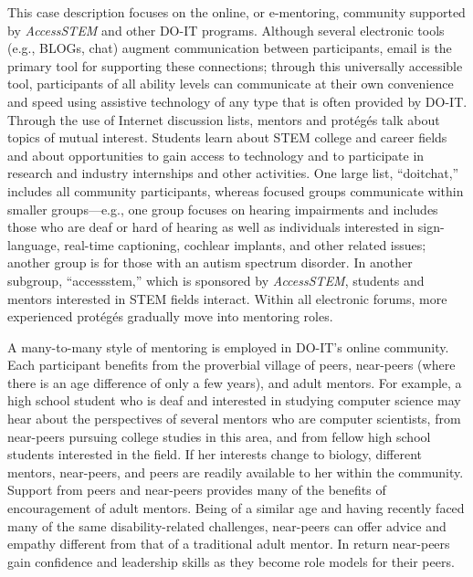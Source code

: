 \documentclass[11.5pt]{sig-alternate} %
\begin{document}
\begin{large}
This case description focuses on the online, or e-mentoring, community supported by\textit{ AccessSTEM} and other DO-IT programs. Although several electronic tools (e.g., BLOGs, chat) augment communication between participants, email is the primary tool for supporting these connections; through this universally accessible tool, participants of all ability levels can communicate at their own convenience and speed using assistive technology of any type that is often provided by DO-IT. Through the use of Internet discussion lists, mentors and protégés talk about topics of mutual interest. Students learn about STEM college and career fields and about opportunities to gain access to technology and to participate in research and industry internships and other activities. One large list, “doitchat,” includes all community participants, whereas focused groups communicate within smaller groups—e.g., one group focuses on hearing impairments and includes those who are deaf or hard of hearing as well as individuals interested in sign-language, real-time captioning, cochlear implants, and other related issues; another group is for those with an autism spectrum disorder. In another subgroup, “accessstem,” which is sponsored by \textit{AccessSTEM}, students and mentors interested in STEM fields interact. Within all electronic forums, more experienced protégés gradually move into mentoring roles.

A many-to-many style of mentoring is employed in DO-IT's online community. Each participant benefits from the proverbial village of peers, near-peers (where there is an age difference of only a few years), and adult mentors. For example, a high school student who is deaf and interested in studying computer science may hear about the perspectives of several mentors who are computer scientists, from near-peers pursuing college studies in this area, and from fellow high school students interested in the field. If her interests change to biology, different mentors, near-peers, and peers are readily available to her within the community. Support from peers and near-peers provides many of the benefits of encouragement of adult mentors. Being of a similar age and having recently faced many of the same disability-related challenges, near-peers can offer advice and empathy different from that of a traditional adult mentor. In return near-peers gain confidence and leadership skills as they become role models for their peers.


\end{large}
\end{document}
